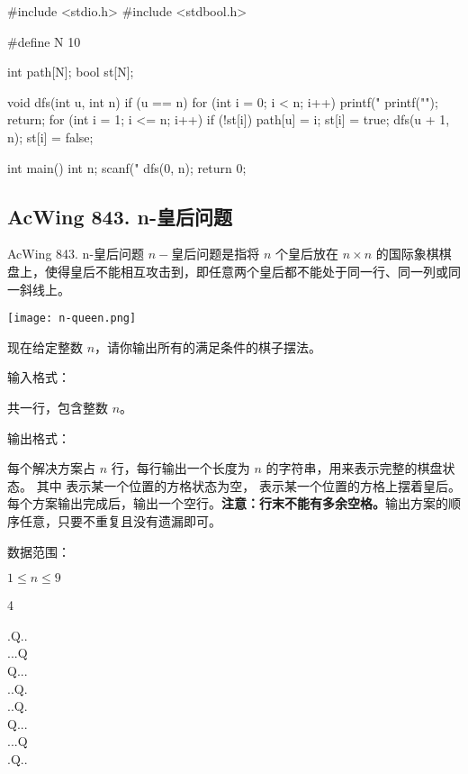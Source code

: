 \begin{mycpptwocol}[排列数字]
    #include <stdio.h>
    #include <stdbool.h>

    #define N 10

    int path[N];
    bool st[N];

    void dfs(int u, int n) {
        if (u == n) {
            for (int i = 0; i < n; i++) {
                printf("%
            }
            printf("\n");
            return;
        }
        for (int i = 1; i <= n; i++) {
            if (!st[i]) {
                path[u] = i;
                st[i] = true;
                dfs(u + 1, n);
                st[i] = false;
            }
        }
    }

    int main() {
        int n;
        scanf("%
        dfs(0, n);
        return 0;
    }
\end{mycpptwocol}

\subsection{AcWing 843. n-皇后问题}
\begin{titledbox}{AcWing 843. n-皇后问题}
    $n-$皇后问题是指将 $n$ 个皇后放在 $n \times n$ 的国际象棋棋盘上，使得皇后不能相互攻击到，即任意两个皇后都不能处于同一行、同一列或同一斜线上。

    \texttt{[image: n-queen.png]}

    现在给定整数 $n$，请你输出所有的满足条件的棋子摆法。

    输入格式：

    共一行，包含整数 $n$。

    输出格式：

    每个解决方案占 $n$ 行，每行输出一个长度为 $n$ 的字符串，用来表示完整的棋盘状态。
    其中  表示某一个位置的方格状态为空， 表示某一个位置的方格上摆着皇后。每个方案输出完成后，输出一个空行。\textbf{注意：行末不能有多余空格。}输出方案的顺序任意，只要不重复且没有遗漏即可。

    数据范围：

    $1 \le n \le 9$

    \begin{inputblock}
        4
    \end{inputblock}
    \begin{outputblock}
        .Q.. \\
        ...Q \\
        Q... \\
        ..Q. \\

        ..Q. \\
        Q... \\
        ...Q \\
        .Q..
    \end{outputblock}
\end{titledbox}

